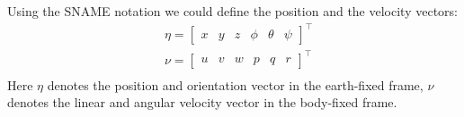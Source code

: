     Using the SNAME notation we could define the position and the velocity vectors:    
    $$
    \begin{aligned}
    & \eta=\left[\begin{array}{llllll}
        x & y & z & \phi & \theta & \psi
        \end{array}\right]^{\top} \\
    & \nu=\left[\begin{array}{llllll}
    u & v & w & p & q & r
    \end{array}\right]^{\top} \\
    \end{aligned}
    $$
    Here $\eta$ denotes the position and orientation vector in the earth-fixed frame, 
    $\nu$ denotes the linear and angular velocity vector in the body-fixed frame.

